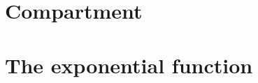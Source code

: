 \documentclass[../../Orator.tex]{subfiles}
\begin{document}
\section{Compartment}



\section{The exponential function}
\end{document}
